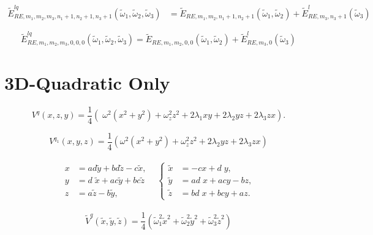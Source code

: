 \documentclass[12pt]{article}
\newcommand{\td}[1]{\tilde{#1}}
\begin{document}
\begin{align}
  \td{E}^{lq}_{RE,m_1,m_2,m_3,n_1+1,n_2+1,n_3+1}(\td{\omega}_1,\td{\omega}_2,\td{\omega}_3)&=\td{E}_{RE,m_1,m_2,n_1+1,n_2+1}(\td{\omega}_1,\td{\omega}_2)+\td{E}^l_{RE,m_3,n_3+1}(\td{\omega}_3)
\end{align}

\begin{equation}
	\td{E}^{lq}_{RE,m_1,m_2,m_3,0,0,0}(\td{\omega}_1,\td{\omega}_2,\td{\omega}_3)=\td{E}_{RE,m_1,m_2,0,0}(\td{\omega}_1,\td{\omega}_2)+\td{E}^l_{RE,m_3,0}(\td{\omega}_3)\nonumber
\end{equation}

\section*{3D-Quadratic Only}

\begin{equation}
V^{q}(x,z,y) = \frac{1}{4}\left(\;\omega^2(x^2 + y^2) + \omega_z^2z^2 + 2\lambda_1 xy + 2\lambda_2 yz + 2\lambda_3 zx\right). \label{special-3D}
\end{equation}

\begin{equation}
	V^{q_1}(x,y,z)=\frac{1}{4}\left(\omega^2(x^2+y^2)+\omega_z^2z^2+2\lambda_2 yz+2\lambda_3 zx\right)\label{vq}
\end{equation}

\begin{align}\label{3D-xyz-IV}
  \begin{split}
  \begin{aligned}
      x &= a d \td{y} + bd\td{z} - c\td{x}, \\
      y &= d\; \td{x} + ac\td{y} + bc\td{z} \\
      z &=a\td{z} - b\td{y}, 
  \end{aligned}
  & 
  \left\{
  \begin{aligned}
    \td{x} &= - cx + d\;y  , \\
    \td{y} &=ad\;x + acy - bz, \\
    \td{z} &= bd\;x + bcy + az.
  \end{aligned}
  \right.
  \end{split}
\end{align}

\begin{equation}
\tilde{V}^{q}(\td{x},\td{y},\td{z})=\frac{1}{4}\left(\td{\omega}_1^2\td{x}^2+\td{\omega}_2^2 \td{y}^2+\td{\omega}_3^2\td{z}^2\right)	\label{V_q}
\end{equation}
\end{document}
